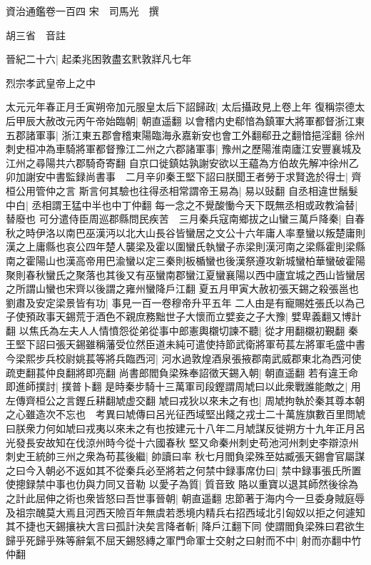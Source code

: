 資治通鑑卷一百四
宋　司馬光　撰

胡三省　音註

晉紀二十六|{
	起柔兆困敦盡玄黓敦牂凡七年}


烈宗孝武皇帝上之中

太元元年春正月壬寅朔帝加元服皇太后下詔歸政|{
	太后攝政見上卷上年}
復稱崇德太后甲辰大赦改元丙午帝始臨朝|{
	朝直遥翻}
以會稽内史郗愔為鎮軍大將軍都督浙江東五郡諸軍事|{
	浙江東五郡會稽東陽臨海永嘉新安也會工外翻郗丑之翻愔挹淫翻}
徐州刺史桓冲為車騎將軍都督豫江二州之六郡諸軍事|{
	豫州之歷陽淮南廬江安豐襄城及江州之尋陽共六郡騎奇寄翻}
自京口徙鎮姑孰謝安欲以王藴為方伯故先解冲徐州乙卯加謝安中書監録尚書事　二月辛卯秦王堅下詔曰朕聞王者勞于求賢逸於得士|{
	齊桓公用管仲之言}
斯言何其驗也往得丞相常謂帝王易為|{
	易以䜴翻}
自丞相違世鬚髮中白|{
	丞相謂王猛中半也中丁仲翻}
每一念之不覺酸慟今天下既無丞相或政教淪替|{
	替廢也}
可分遣侍臣周巡郡縣問民疾苦　三月秦兵寇南鄉拔之山蠻三萬戶降秦|{
	自春秋之時伊洛以南巴巫漢沔以北大山長谷皆蠻居之文公十六年庸人率羣蠻以叛楚庸則漢之上庸縣也哀公四年楚人襲梁及霍以圍蠻氏執蠻子赤梁則漢河南之梁縣霍則梁縣南之霍陽山也漢高帝用巴渝蠻以定三秦則板楯蠻也後漢祭遵攻新城蠻柏華蠻破霍陽聚則春秋蠻氏之聚落也其後又有巫蠻南郡蠻江夏蠻襄陽以西中廬宜城之西山皆蠻居之所謂山蠻也宋齊以後謂之雍州蠻降戶江翻}
夏五月甲寅大赦初張天錫之殺張邕也劉肅及安定梁景皆有功|{
	事見一百一卷穆帝升平五年}
二人由是有寵賜姓張氏以為己子使預政事天錫荒于酒色不親庶務黜世子大懷而立嬖妾之子大豫|{
	嬖卑義翻又博計翻}
以焦氏為左夫人人情憤怨從弟從事中郎憲輿櫬切諫不聽|{
	從才用翻櫬初覲翻}
秦王堅下詔曰張天錫雖稱藩受位然臣道未純可遣使持節武衛將軍苟萇左將軍毛盛中書今梁熙步兵校尉姚萇等將兵臨西河|{
	河水過敦煌酒泉張掖郡南武威郡東北為西河使疏吏翻萇仲良翻將即亮翻}
尚書郎閻負梁殊奉詔徵天錫入朝|{
	朝直遥翻}
若有違王命即進師撲討|{
	撲普卜翻}
是時秦步騎十三萬軍司段鏗謂周虓曰以此衆戰誰能敵之|{
	用左傳齊桓公之言鏗丘耕翻虓虚交翻}
虓曰戎狄以來未之有也|{
	周虓拘執於秦其尊本朝之心雖造次不忘也　考異曰虓傳曰呂光征西域堅出餞之戎士二十萬旌旗數百里問虓曰朕衆力何如虓曰戎夷以來未之有也按建元十八年二月虓謀反徙朔方十九年正月呂光發長安故知在伐涼州時今從十六國春秋}
堅又命秦州刺史苟池河州刺史李辯涼州刺史王統帥三州之衆為苟萇後繼|{
	帥讀曰率}
秋七月閻負梁殊至姑臧張天錫會官屬謀之曰今入朝必不返如其不從秦兵必至將若之何禁中録事席仂曰|{
	禁中録事張氏所置使摠録禁中事也仂與力同又音勒}
以愛子為質|{
	質音致}
賂以重寶以退其師然後徐為之計此屈伸之術也衆皆怒曰吾世事晉朝|{
	朝直遥翻}
忠節著于海内今一旦委身賊庭辱及祖宗醜莫大焉且河西天險百年無虞若悉境内精兵右招西域北引匈奴以拒之何遽知其不捷也天錫攘袂大言曰孤計決矣言降者斬|{
	降戶江翻下同}
使謂閻負梁殊曰君欲生歸乎死歸乎殊等辭氣不屈天錫怒縳之軍門命軍士交射之曰射而不中|{
	射而亦翻中竹仲翻}
